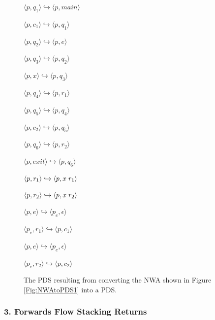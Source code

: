 \begin{figure}[htbp]
  \centering
    \begin{description}
      \centering
      \item{ $\langle p,q_1 \rangle \hookrightarrow \langle p,main \rangle$}
      \item{ $\langle p,c_1 \rangle \hookrightarrow \langle p,q_1 \rangle$}
      \item{ $\langle p,q_2 \rangle \hookrightarrow \langle p,e \rangle$}
      \item{ $\langle p,q_3 \rangle \hookrightarrow \langle p,q_2 \rangle$}
      \item{ $\langle p,x \rangle \hookrightarrow \langle p,q_3 \rangle$}
      \item{ $\langle p,q_4 \rangle \hookrightarrow \langle p,r_1 \rangle$}
      \item{ $\langle p,q_5 \rangle \hookrightarrow \langle p,q_4 \rangle$}
      \item{ $\langle p,c_2 \rangle \hookrightarrow \langle p,q_5 \rangle$}
      \item{ $\langle p,q_6 \rangle \hookrightarrow \langle p,r_2 \rangle$}
      \item{ $\langle p,exit \rangle \hookrightarrow \langle p,q_6 \rangle$}
      \item{ $\langle p,r_1 \rangle \hookrightarrow \langle p,x \hspace{.1cm} r_1 \rangle$}
      \item{ $\langle p,r_2 \rangle \hookrightarrow \langle p,x \hspace{.1cm} r_2 \rangle$}
      \item{ $\langle p,e \rangle \hookrightarrow \langle p_e, \epsilon \rangle$}
      \item{ $\langle p_e,r_1 \rangle \hookrightarrow \langle p,c_1 \rangle$}
      \item{ $\langle p,e \rangle \hookrightarrow \langle p_e, \epsilon \rangle$}
      \item{ $\langle p_e,r_2 \rangle \hookrightarrow \langle p,c_2 \rangle$}
    \end{description}
  \caption{The PDS resulting from converting the NWA shown in Figure \ref{Fig:NWAtoPDS1} into a PDS.}
  \label{Fig:NWAtoPDS5}
\end{figure}

\subsubsection{3. Forwards Flow Stacking Returns}

